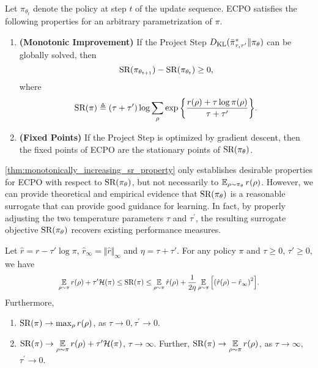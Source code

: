 \begin{thm}
\label{thm:monotonically_increasing_sr_property}
Let $\pi_{\theta_{t}}$ denote the policy at step $t$ of the update
sequence.
ECPO satisfies the following properties for an arbitrary parametrization of $\pi$.
\begin{enumerate}
	\item {\bf (Monotonic Improvement)} 
	If the Project Step $D_{\mathrm{KL}}( \bar{\pi}_{\tau,\tau^{\prime}}^* \| \pi_\theta )$ can be globally solved,
then 
	\begin{equation*}
	\text{SR}(\pi_{\theta_{t+1}}) - \text{SR}(\pi_{\theta_t})\ge 0,
	\end{equation*}
	where
	{\small
	\begin{equation}
	\label{eq:SR}
	\text{SR}(\pi) \triangleq (\tau + \tau^{\prime})\log{ \sum_{\rho}{ \exp\left\{ \frac{r(\rho) + \tau \log{\pi(\rho)} }{\tau + \tau^{\prime}} \right\} }}.
	\end{equation}
	}
	\item {\bf (Fixed Points)} If the Project Step is optimized by gradient descent, then the fixed points of ECPO are the 
	stationary points of $\text{SR}(\pi_\theta)$. 
\end{enumerate}
\end{thm}
\noindent \cref{thm:monotonically_increasing_sr_property} only establishes
desirable properties for ECPO with respect to $\text{SR}(\pi_\theta)$,
but not necessarily to $\operatorname*{\mathbb{E}}_{\rho\sim \pi_\theta}{r(\rho)}$. However, we can provide
theoretical and empirical evidence that
$\text{SR}(\pi_\theta)$ is a reasonable surrogate 
that can provide good guidance for learning.
In fact, by properly adjusting the two temperature parameters $\tau$ and
$\tau^{\prime}$,
the resulting surrogate objective $\text{SR}(\pi_\theta)$
recovers existing performance measures.

\begin{lem}
\label{lem:sr}
Let $\hat{r}=r-\tau' \log\pi$, $\hat{r}_\infty = \Vert \hat{r} \Vert_\infty$ and $\eta = \tau+\tau'$. For any policy $\pi$ and $\tau\geq 0$, $\tau'\geq 0$, we have
\begin{align*}
\scalemath{0.85}{
\ep\limits_{\rho \sim \pi}{r(\rho)} + \tau' \cH(\pi) \leq \SR(\pi) \leq  \ep\limits_{\rho \sim \pi}{\hat{r}(\rho)} + \frac{1}{2\eta} \ep_{\rho\sim \pi}{\left[\left( \hat{r}(\rho) - \hat{r}_\infty \right)^2 \right]}.
}
\end{align*}
Furthermore, 
\begin{enumerate}[label=(\roman*)]
	\item  $\text{SR}(\pi) \to \max_{\rho}{r(\rho)}$, as $\tau \to 0, \tau^{\prime} \to 0$.
	\item $\text{SR}(\pi) \to \operatorname*{\mathbb{E}}\limits_{\rho \sim \pi}{r(\rho)} + \tau^\prime \mathcal{H}(\pi) $, $\tau \to \infty$. Further, $\text{SR}(\pi) \to \operatorname*{\mathbb{E}}\limits_{\rho \sim \pi}{r(\rho)}$, as $\tau \to \infty$, $\tau^{\prime} \to 0$.
\end{enumerate}
\end{lem}

